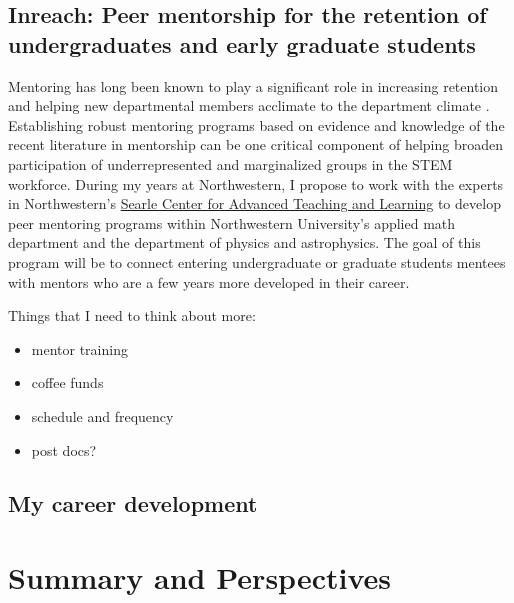 \documentclass[aasms,12pt]{article}
\begin{document}
\subsection{Inreach: Peer mentorship for the retention of undergraduates and early graduate students}
Mentoring has long been known to play a significant role in increasing retention and helping new departmental members acclimate to the department climate \citep{hunt&michael1983}.
Establishing robust mentoring programs based on evidence and knowledge of the recent literature in mentorship \citep[as in e.g.,][]{crisp&all2009, crisp&all2017} can be one critical component of helping broaden participation of underrepresented and marginalized groups in the STEM workforce.
During my years at Northwestern, I propose to work with the experts in Northwestern's \href{https://www.northwestern.edu/searle/index.html}{Searle Center for Advanced Teaching and Learning} to develop peer mentoring programs within Northwestern University's applied math department and the department of physics and astrophysics.
The goal of this program will be to connect entering undergraduate or graduate students mentees with mentors who are a few years more developed in their career.

Things that I need to think about more:
\begin{itemize}
\item mentor training
\item coffee funds
\item schedule and frequency
\item post docs?
\end{itemize}



\subsection{My career development}



\section{Summary and Perspectives}
\label{sct:summary}



\end{document}
